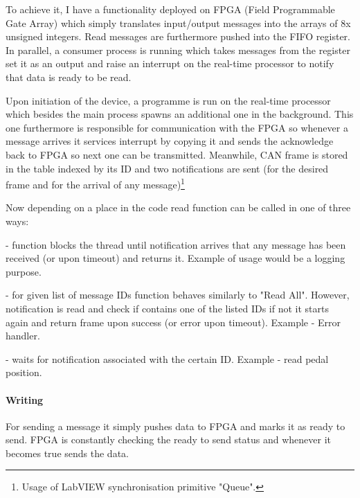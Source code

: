 To achieve it, I have a functionality deployed on FPGA (Field Programmable Gate Array) which simply translates input/output messages into the arrays of 8x unsigned integers. Read messages are furthermore pushed into the FIFO register. In parallel, a consumer process is running which takes messages from the register set it as an output and raise an interrupt on the real-time processor to notify that data is ready to be read.

Upon initiation of the device, a programme is run on the real-time processor which besides the main process spawns an additional one in the background. This one furthermore is responsible for communication with the FPGA so whenever a message arrives it services interrupt by copying it and sends the acknowledge back to FPGA so next one can be transmitted. Meanwhile, CAN frame is stored in the table indexed by its ID and two notifications are sent (for the desired frame and for the arrival of any message)\footnote{Usage of LabVIEW synchronisation primitive "Queue".}%

Now depending on a place in the code read function can be called in one of three ways:
\begin{description}[labelindent=1cm]
    \item[Read All] - function blocks the thread until notification arrives that any message has been received (or upon timeout) and returns it. Example of usage would be a logging purpose.
    \item[Read Some] - for given list of message IDs function behaves similarly to "Read All". However, notification is read and check if contains one of the listed IDs if not it starts again and return frame upon success (or error upon timeout). Example - Error handler.
    \item[Read ID] - waits for notification associated with the certain ID. Example - read pedal position.
    


\end{description}

\paragraph{Writing}
For sending a message it simply pushes data to FPGA and marks it as ready to send. FPGA is constantly checking the ready to send status and whenever it becomes true sends the data.


